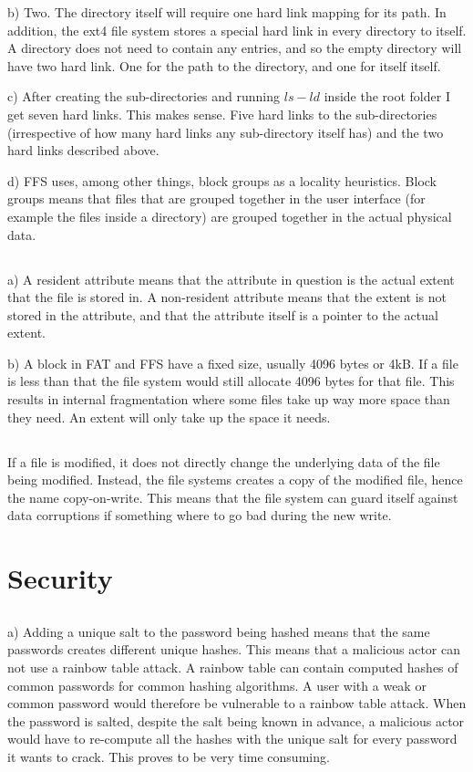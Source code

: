 \documentclass{article}
\begin{document}
b) Two. The directory itself will require one hard link mapping for its path. In addition, the ext4 file system stores a special hard link in every directory to itself. A directory does not need to contain any entries, and so the empty directory will have two hard link. One for the path to the directory, and one for itself itself.

c) After creating the sub-directories and running $ls -ld$ inside the root folder I get seven hard links. This makes sense. Five hard links to the sub-directories (irrespective of how many hard links any sub-directory itself has) and the two hard links described above.

d) FFS uses, among other things, block groups as a locality heuristics. Block groups means that files that are grouped together in the user interface (for example the files inside a directory) are grouped together in the actual physical data.

\subsection{}
a) A resident attribute means that the attribute in question is the actual extent that the file is stored in. A non-resident attribute means that the extent is not stored in the attribute, and that the attribute itself is a pointer to the actual extent.

b) A block in FAT and FFS have a fixed size, usually 4096 bytes or 4kB. If a file is less than that the file system would still allocate 4096 bytes for that file. This results in internal fragmentation where some files take up way more space than they need. An extent will only take up the space it needs.

\subsection{}
If a file is modified, it does not directly change the underlying data of the file being modified. Instead, the file systems creates a copy of the modified file, hence the name copy-on-write. This means that the file system can guard itself against data corruptions if something where to go bad during the new write.

\section{Security}
\subsection{}
a) Adding a unique salt to the password being hashed means that the same passwords creates different unique hashes. This means that a malicious actor can not use a rainbow table attack. A rainbow table can contain computed hashes of common passwords for common hashing algorithms. A user with a weak or common password would therefore be vulnerable to a rainbow table attack. When the password is salted, despite the salt being known in advance, a malicious actor would have to re-compute all the hashes with the unique salt for every password it wants to crack. This proves to be very time consuming.
\end{document}
